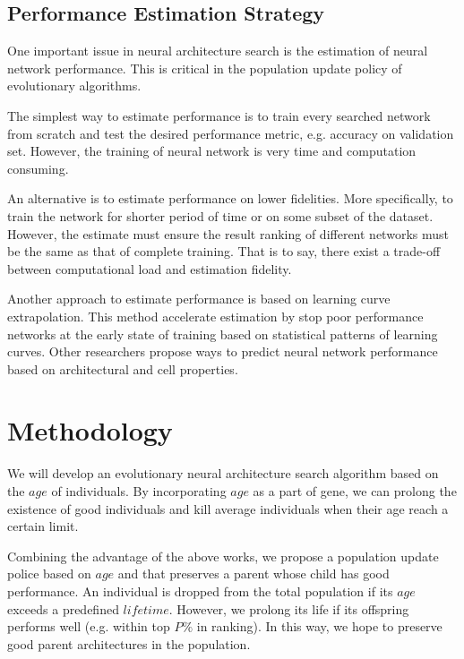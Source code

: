 \documentclass[conference]{IEEEtran}
\begin{document}
    \subsection{Performance Estimation Strategy}
    One important issue in neural architecture search is the estimation of neural network performance. This is critical in the population update policy of evolutionary algorithms. 

    The simplest way to estimate performance is to train every searched network from scratch and test the desired performance metric, e.g. accuracy on validation set. However, the training of neural network is very time and computation consuming. 
    
    An alternative is to estimate performance on lower fidelities. More specifically, to train the network for shorter period of time\cite{zoph2018learning} or on some subset of the dataset\cite{klein2016fast}. However, the estimate must ensure the result ranking of different networks must be the same as that of complete training. That is to say, there exist a trade-off between computational load and estimation fidelity.

    Another approach to estimate performance is based on learning curve extrapolation\cite{domhan2015speeding}. This method accelerate estimation by stop poor performance networks at the early state of training based on statistical patterns of learning curves. Other researchers propose ways to predict neural network performance based on architectural and cell properties\cite{liu2018progressive}. 

    \section{Methodology}

    We will develop an evolutionary neural architecture search algorithm based on the $age$ of individuals. By incorporating $age$ as a part of gene, we can prolong the existence of good individuals\cite{DBLP:journals/corr/abs-1802-01548} and kill average individuals when their age reach a certain limit\cite{Hornby:2006:AAP:1143997.1144142}. 

    Combining the advantage of the above works, we propose a population update police based on $age$ and that preserves a parent whose child has good performance. An individual is dropped from the total population if its $age$ exceeds a predefined $lifetime$. However, we prolong its life if its offspring performs well (e.g. within top $P\%$ in ranking). In this way, we hope to preserve good parent architectures in the population.
\end{document}
